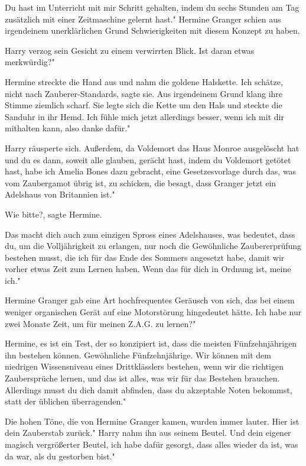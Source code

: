 \glqq{}Du hast im Unterricht mit mir Schritt gehalten, indem du sechs Stunden am
Tag zusätzlich mit einer Zeitmaschine gelernt hast." Hermine Granger schien aus
irgendeinem unerklärlichen Grund Schwierigkeiten mit diesem Konzept zu haben.

Harry verzog sein Gesicht zu einem verwirrten Blick. \glqq{}Ist daran etwas
merkwürdig?"

Hermine streckte die Hand aus und nahm die goldene Halskette. \glqq{}Ich schätze,
nicht nach Zauberer-Standards\grqq{}, sagte sie. Aus irgendeinem Grund klang
ihre Stimme ziemlich scharf. Sie legte sich die Kette um den Hals und steckte
die Sanduhr in ihr Hemd. \glqq{}Ich fühle mich jetzt allerdings besser, wenn ich
mit dir mithalten kann, also danke dafür."

Harry räusperte sich. \glqq{}Außerdem, da Voldemort das Haus Monroe ausgelöscht
hat und du es dann, soweit alle glauben, gerächt hast, indem du Voldemort
getötet hast, habe ich Amelia Bones dazu gebracht, eine Gesetzesvorlage durch
das, was vom Zaubergamot übrig ist, zu schicken, die besagt, dass Granger jetzt
ein Adelshaus von Britannien ist."

\glqq{}Wie bitte?\grqq{}, sagte Hermine.

\glqq{}Das macht dich auch zum einzigen Spross eines Adelshauses, was bedeutet,
dass du, um die Volljährigkeit zu erlangen, nur noch die Gewöhnliche
Zaubererprüfung bestehen musst, die ich für das Ende des Sommers angesetzt habe,
damit wir vorher etwas Zeit zum Lernen haben. Wenn das für dich in Ordnung ist,
meine ich."

Hermine Granger gab eine Art hochfrequentes Geräusch von sich, das bei einem
weniger organischen Gerät auf eine Motorstörung hingedeutet hätte. \glqq{}Ich
habe nur zwei Monate Zeit, um für meinen Z.A.G. zu lernen?"

\glqq{}Hermine, es ist ein Test, der so konzipiert ist, dass die meisten
Fünfzehnjährigen ihn bestehen können. Gewöhnliche Fünfzehnjährige. Wir können
mit dem niedrigen Wissensniveau eines Drittklässlers bestehen, wenn wir die
richtigen Zaubersprüche lernen, und das ist alles, was wir für das Bestehen
brauchen. Allerdings musst du dich damit abfinden, dass du akzeptable Noten
bekommst, statt der üblichen überragenden."

Die hohen Töne, die von Hermine Granger kamen, wurden immer lauter. \glqq{}Hier
ist dein Zauberstab zurück." Harry nahm ihn aus seinem Beutel. \glqq{}Und dein
eigener magisch vergrößerter Beutel, ich habe dafür gesorgt, dass alles wieder
da ist, was da war, als du gestorben bist."

